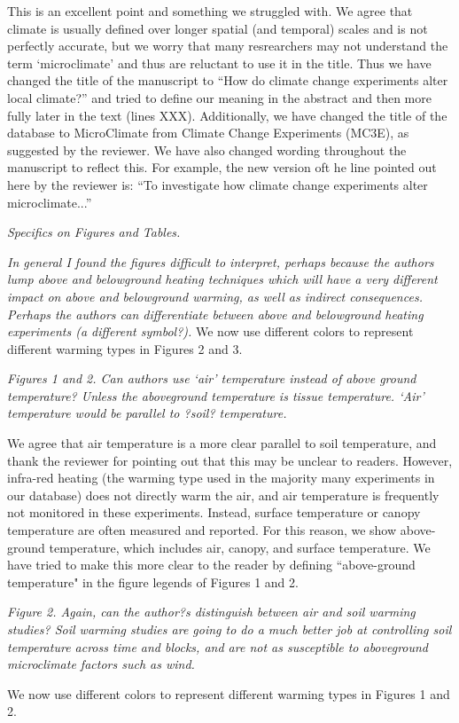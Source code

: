 \documentclass[11pt,a4paper]{letter}
\begin{document}
\par This is an excellent point and something we struggled with. We agree that climate is usually defined over longer spatial (and temporal) scales and is not perfectly accurate, but we worry that many resrearchers may not understand the term `microclimate' and thus are reluctant to use it in the title. Thus we have changed the title of the manuscript to ``How do climate change experiments alter local climate?'' and tried to define our meaning in the abstract and then more fully later in the text (lines XXX). Additionally, we have changed the title of the database to MicroClimate from Climate Change Experiments (MC3E), as suggested by the reviewer. We have also changed wording throughout the manuscript to reflect this. For example, the new version oft he line pointed out here by the reviewer is: ``To investigate how climate change experiments alter microclimate...''

\par \emph{Specifics on Figures and Tables.}
\par \emph{In general I found the figures difficult to interpret, perhaps because the authors lump above and belowground heating techniques which will have a very different impact on above and belowground warming, as well as indirect consequences.  Perhaps the authors can differentiate between above and belowground heating experiments (a different symbol?).}
We now use different colors  to represent different warming types in Figures 2 and 3.

\par \emph{Figures 1 and 2. Can authors use `air' temperature instead of above ground temperature? Unless the aboveground temperature is tissue temperature.  `Air' temperature would be parallel to ?soil? temperature. }
\par We agree that air temperature is a more clear parallel to soil temperature, and thank the reviewer for pointing out that this may be unclear to readers. However, infra-red heating (the warming type used in the majority many experiments in our database)  does not directly warm the air, and air temperature is frequently not monitored in these experiments. Instead, surface temperature or canopy temperature are often measured and reported. For this reason, we show above-ground temperature, which includes air, canopy, and surface temperature. We have tried to make this more clear to the reader by defining ``above-ground temperature" in the figure legends of Figures 1 and 2.

\par \emph{Figure 2.  Again, can the author?s distinguish between air and soil warming studies?  Soil warming studies are going to do a much better job at controlling soil temperature across time and blocks, and are not as susceptible to aboveground microclimate factors such as wind.}
\par We now use different colors to represent different warming types in Figures 1 and 2.
\end{document}
